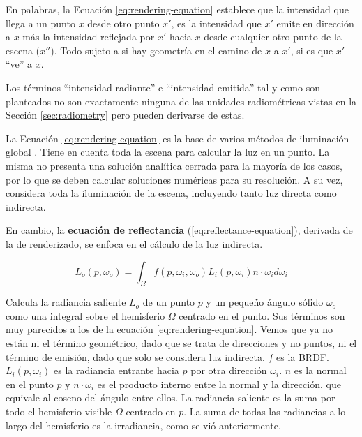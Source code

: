 En palabras, la Ecuación \ref{eq:rendering-equation} establece que la intensidad que llega a un punto $x$ desde otro punto $x'$, es la intensidad que $x'$ emite en dirección a $x$ más la intensidad reflejada por $x'$ hacia $x$ desde cualquier otro punto de la escena ($x''$).
Todo sujeto a si hay geometría en el camino de $x$ a $x'$, si es que $x'$ ``ve'' a $x$.

Los términos ``intensidad radiante'' e ``intensidad emitida'' tal y como son planteados no son exactamente ninguna de las unidades radiométricas vistas en la Sección \ref{sec:radiometry} pero pueden derivarse de estas.

La Ecuación \ref{eq:rendering-equation} es la base de varios métodos de iluminación global \cite{rtr}.
Tiene en cuenta toda la escena para calcular la luz en un punto.
La misma no presenta una solución analítica cerrada para la mayoría de los casos, por lo que se deben calcular soluciones numéricas para su resolución.
A su vez, considera toda la iluminación de la escena, incluyendo tanto luz directa como indirecta.

En cambio, la \textbf{ecuación de reflectancia} (\ref{eq:reflectance-equation}), derivada de la de renderizado, se enfoca en el cálculo de la luz indirecta.

\begin{equation}\label{eq:reflectance-equation}
    L_o(p, \omega_o) = \int_{\Omega}{f(p, \omega_i, \omega_o) L_i(p, \omega_i) n \cdot \omega_i d\omega_i}
\end{equation}

Calcula la radiancia saliente $L_o$ de un punto $p$ y un pequeño ángulo sólido $\omega_o$ como una integral sobre el hemisferio $\Omega$ centrado en el punto.
Sus términos son muy parecidos a los de la ecuación \ref{eq:rendering-equation}.
Vemos que ya no están ni el término geométrico, dado que se trata de direcciones y no puntos, ni el término de emisión, dado que solo se considera luz indirecta.
$f$ es la BRDF.
$L_i(p, \omega_i)$ es la radiancia entrante hacia $p$ por otra dirección $\omega_i$.
$n$ es la normal en el punto $p$ y $n \cdot \omega_i$ es el producto interno entre la normal y la dirección, que equivale al coseno del ángulo entre ellos.
La radiancia saliente es la suma por todo el hemisferio visible $\Omega$ centrado en $p$.
La suma de todas las radiancias a lo largo del hemisferio es la irradiancia, como se vió anteriormente.



